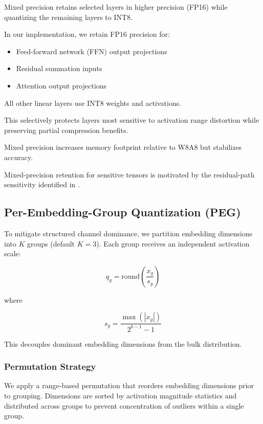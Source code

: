 \documentclass[conference]{IEEEtran}
\begin{document}
Mixed precision retains selected layers in higher precision (FP16) while quantizing the remaining layers to INT8.

In our implementation, we retain FP16 precision for:

\begin{itemize}
\item Feed-forward network (FFN) output projections
\item Residual summation inputs
\item Attention output projections
\end{itemize}

All other linear layers use INT8 weights and activations.

This selectively protects layers most sensitive to activation range distortion while preserving partial compression benefits.

Mixed precision increases memory footprint relative to W8A8 but stabilizes accuracy.

Mixed-precision retention for sensitive tensors is motivated by the residual-path sensitivity identified in \cite{bondarenko2021understanding}.

\subsection{Per-Embedding-Group Quantization (PEG)}

To mitigate structured channel dominance, we partition embedding dimensions into $K$ groups (default $K=3$). Each group receives an independent activation scale:

\begin{equation}
q_g = \mathrm{round}\left(\frac{x_g}{s_g}\right)
\end{equation}

where

\begin{equation}
s_g = \frac{\max(|x_g|)}{2^{b-1}-1}
\end{equation}

This decouples dominant embedding dimensions from the bulk distribution.

\subsubsection{Permutation Strategy}

We apply a range-based permutation that reorders embedding dimensions prior to grouping. Dimensions are sorted by activation magnitude statistics and distributed across groups to prevent concentration of outliers within a single group.
\end{document}

